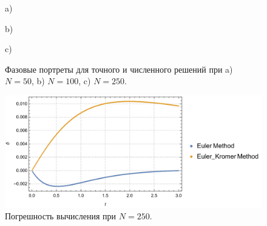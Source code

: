 \documentclass[
11pt,
master, %
subf, %
href, %
colorlinks=true, %
times, %
]{disser}
\begin{document}
\newpage
\begin{figure}[h!]
\begin{minipage}[h]{1\linewidth}
 a) \\
\end{minipage}
\vfill
\begin{minipage}[h]{1\linewidth}
 b) \\
\end{minipage}
\vfill
\begin{minipage}[h]{1\linewidth}
 c) \\
\end{minipage}
\caption{Фазовые портреты для точного и численного решений при a) $N = 50$, b) $N = 100$, c) $N = 250$.}
\label{ris:3}
\end{figure}

\newpage
\begin{figure}[h]
  \centering
  \includegraphics[width=1\linewidth]{plRESer_250}
  \caption{Погрешность вычисления при $N = 250$.}
  \label{ris:4}
\end{figure}
\end{document}
